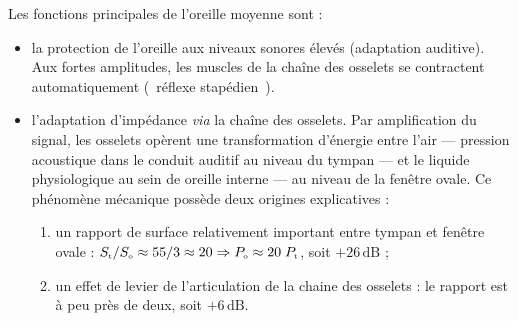 
Les fonctions principales de l'oreille moyenne sont :
\begin{itemize}
\item la protection de l'oreille aux niveaux sonores élevés (adaptation auditive). Aux fortes amplitudes, les muscles de la chaîne des osselets se contractent automatiquement (\og~réflexe stapédien~\fg). 
\item l'adaptation d'impédance \textit{via} la chaîne des osselets. Par amplification du signal, les osselets opèrent une transformation d'énergie entre l'air --- pression acoustique dans le conduit auditif au niveau du tympan --- et le liquide physiologique au sein de oreille interne --- au niveau de la fenêtre ovale.
Ce phénomène mécanique possède deux origines explicatives :
\begin{enumerate}
\item un rapport de surface relativement important entre tympan et fenêtre ovale :
$S_{\mbox{\tiny t}}/S_{\mbox{\tiny o}} \approx 55/3 \approx 20
\Rightarrow P_{\mbox{\tiny o}} \approx 20\; P_{\mbox{\tiny t}}$, soit $+26\,\mbox{dB}$ ;
\item un effet de levier de l'articulation de la chaine des osselets :
le rapport est à peu près de deux, soit $+6\,\mbox{dB}$.
\end{enumerate}
\end{itemize}

